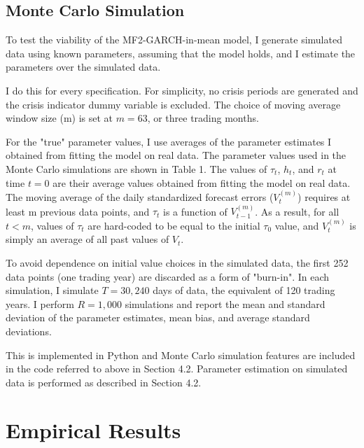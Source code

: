 \documentclass[12pt]{article}
\begin{document}
\subsection{Monte Carlo Simulation}
To test the viability of the MF2-GARCH-in-mean model, I generate simulated data using known parameters, assuming that the model holds, and I estimate the parameters over the simulated data.\par
I do this for every specification. For simplicity, no crisis periods are generated and the crisis indicator dummy variable is excluded. The choice of moving average window size (m) is set at $m=63$, or three trading months.\par
For the "true" parameter values, I use averages of the parameter estimates I obtained from fitting the model on real data. The parameter values used in the Monte Carlo simulations are shown in Table 1. The values of $\tau_t$, $h_t$, and $r_t$ at time $t=0$ are their average values obtained from fitting the model on real data. The moving average of the daily standardized forecast errors ($V_t^{(m)}$) requires at least m previous data points, and $\tau_t$ is a function of $V_{t-1}^{(m)}$. As a result, for all $t<m$, values of $\tau_t$ are hard-coded to be equal to the initial $\tau_0$ value, and $V_t^{(m)}$ is simply an average of all past values of $V_t$.\par
To avoid dependence on initial value choices in the simulated data, the first 252 data points (one trading year) are discarded as a form of "burn-in". In each simulation, I simulate $T=30,240$ days of data, the equivalent of 120 trading years. I perform $R=1,000$ simulations and report the mean and standard deviation of the parameter estimates, mean bias, and average standard deviations.\par
This is  implemented in Python and Monte Carlo simulation features are included in the code referred to above in Section 4.2. Parameter estimation on simulated data is performed as described in Section 4.2.


\section{Empirical Results}
\end{document}
